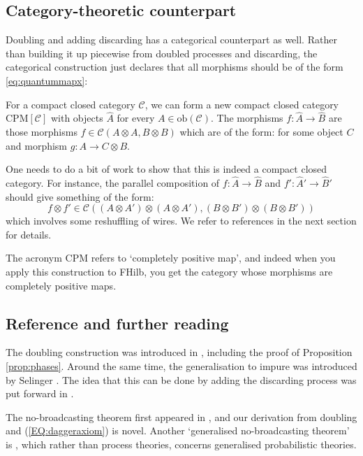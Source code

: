 \documentclass[12pt]{article}
\begin{document}
\subsection{Category-theoretic counterpart}

Doubling and adding discarding has a categorical counterpart as well. Rather than building it up piecewise from doubled processes and discarding, the categorical construction just declares that all morphisms should be of the form \eqref{eq:quantummapx}:

\begin{definition}
  For a compact closed category $\mathcal C$, we can form a new compact closed category $\textrm{CPM}[\mathcal C]$ with objects $\widehat A$ for every $A \in \textrm{ob}(\mathcal C)$. The morphisms $f : \widehat A \to \widehat B$ are those morphisms $f \in \mathcal C(A \otimes A, B \otimes B)$ which are of the form:
  for some object $C$ and morphism $g : A \to C \otimes B$.
\end{definition}

One needs to do a bit of work to show that this is indeed a compact closed category. For instance, the parallel composition of $f : \widehat A \to \widehat B$ and $f' : \widehat A' \to \widehat B'$ should give something of the form:
\[ 
f \otimes f' \in \mathcal C((A \otimes A') \otimes (A \otimes A'), (B \otimes B') \otimes (B \otimes B'))
\]
which involves some reshuffling of wires. We refer to references in the next section for details.

The acronym CPM refers to `completely positive map', and indeed when you apply this construction to FHilb, you get the category whose morphisms are completely positive maps.

\subsection{Reference and further reading}  
  
The doubling construction was introduced in \cite{DeLL}, including the  proof of Proposition \ref{prop:phases}. Around the same time, the  generalisation to impure was introduced by Selinger \cite{SelingerCPM}. The idea that this can be done by adding the discarding process was put forward in \cite{SelingerAxiom}. 

The no-broadcasting theorem first appeared in \cite{Nobroadcast}, and our derivation from doubling and (\ref{EQ:daggeraxiom})   is novel. Another `generalised no-broadcasting theorem' is \cite{BBLW}, which rather than  process theories, concerns  generalised probabilistic theories.
\end{document}
